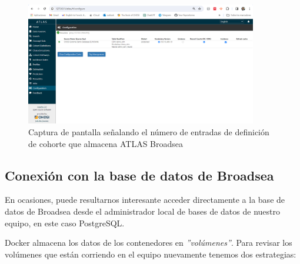 \documentclass{article}
\begin{document}
\begin{enumerate}
\begin{figure}[H]
    \centering
    \includegraphics[width=0.90\textwidth]{images/atlasBroadseaDB.png}
     \caption{Captura de pantalla señalando el número de entradas de definición de cohorte que almacena ATLAS Broadsea}
    \label{fig:atlasBroadseaDB}
\end{figure}
    
\end{enumerate}

\subsection{Conexión con la base de datos de Broadsea}

En ocasiones, puede resultarnos interesante acceder directamente a la base de datos de Broadsea desde el administrador local de bases de datos de nuestro equipo, en este caso PostgreSQL.

Docker almacena los datos de los contenedores en \textit{''volúmenes''}. Para revisar los volúmenes que están corriendo en el equipo nuevamente tenemos dos estrategias:
\end{document}
